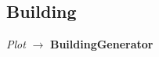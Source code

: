 \subsection{Building}
\begin{center}    
    \textit{Plot} $\rightarrow$ \textbf{BuildingGenerator}
\end{center}
